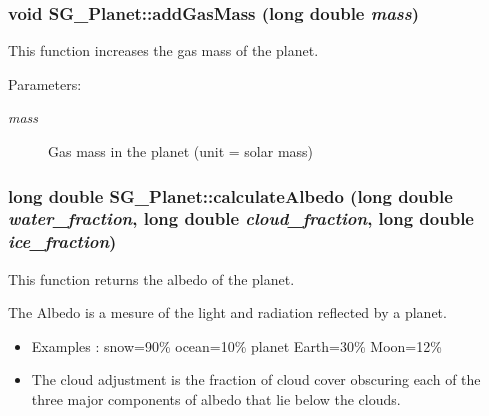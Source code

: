 \subsubsection{\setlength{\rightskip}{0pt plus 5cm}void SG\_\-Planet::add\-Gas\-Mass (long double {\em mass})}\label{class_s_g___planet_a11}


This function increases the gas mass of the planet. 

\begin{Desc}
\item[Parameters:]
\begin{description}
\item[{\em mass}]Gas mass in the planet (unit = solar mass) \end{description}
\end{Desc}
\subsubsection{\setlength{\rightskip}{0pt plus 5cm}long double SG\_\-Planet::calculate\-Albedo (long double {\em water\_\-fraction}, long double {\em cloud\_\-fraction}, long double {\em ice\_\-fraction})\hspace{0.3cm}{\tt  [protected]}}\label{class_s_g___planet_b21}


This function returns the albedo of the planet. 

The Albedo is a mesure of the light and radiation reflected by a planet.\begin{itemize}
\item Examples : snow=90\% ocean=10\% planet Earth=30\% Moon=12\%\item The cloud adjustment is the fraction of cloud cover obscuring each of the three major components of albedo that lie below the clouds. 
\end{itemize}
